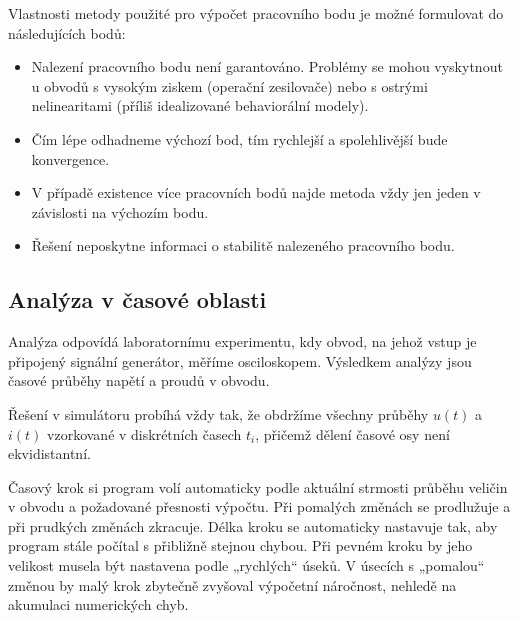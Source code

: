       \begin{mdframed}[style=mdnote]
        \begin{note}
          Vlastnosti metody použité pro výpočet pracovního bodu je možné formulovat do následujících
          bodů:
          \begin{itemize}[noitemsep]
            \item Nalezení pracovního bodu není garantováno. Problémy se mohou vyskytnout u obvodů s
                  vysokým ziskem (operační zesilovače) nebo s ostrými nelinearitami (příliš
                  idealizované behaviorální modely).
            \item Čím lépe odhadneme výchozí bod, tím rychlejší a spolehlivější bude konvergence. 
            \item V případě existence více pracovních bodů najde metoda vždy jen jeden v závislosti
                  na výchozím bodu. 
            \item Řešení neposkytne informaci o stabilitě nalezeného pracovního bodu.
          \end{itemize}
        \end{note}
      \end{mdframed}    

    \subsection{Analýza v časové oblasti}
      Analýza odpovídá laboratornímu experimentu, kdy obvod, na jehož vstup je připojený signální
      generátor, měříme osciloskopem. Výsledkem analýzy jsou časové průběhy napětí a proudů v
      obvodu.


      Řešení v simulátoru probíhá vždy tak, že obdržíme všechny průběhy \(u(t)\) a \(i(t)\)
      vzorkované v diskrétních časech \(t_i\), přičemž dělení časové osy není ekvidistantní.

      Časový krok si program volí automaticky podle aktuální strmosti průběhu veličin v obvodu a
      požadované přesnosti výpočtu. Při pomalých změnách se prodlužuje a při prudkých změnách
      zkracuje. Délka kroku se automaticky nastavuje tak, aby program stále počítal s přibližně
      stejnou chybou. Při pevném kroku by jeho velikost musela být nastavena podle „rychlých“ úseků.
      V úsecích s „pomalou“ změnou by malý krok zbytečně zvyšoval výpočetní náročnost, nehledě na
      akumulaci numerických chyb.

